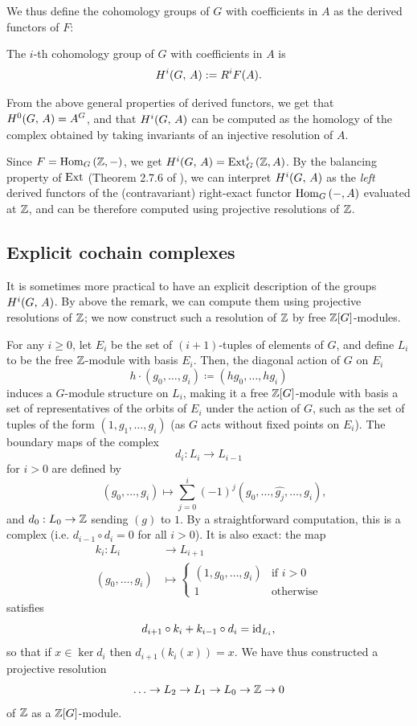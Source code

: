 \documentclass[a4paper, oneside]{memoir}
\begin{document}
We thus define the cohomology groups of $G$ with coefficients in $A$ as the derived functors of $F$:

\begin{definition}
    The $i$-th cohomology group of $G$ with coefficients in $A$ is
    \[
        H^{i}( G, \, A ):=R^iF(A).
    \]
\end{definition}
From the above general properties of derived functors, we get that $H^{0}( G, \, A )=A^G$, and that $H^{i}( G, \, A )$ can be computed as the homology of the complex obtained by taking invariants of an injective resolution of $A$.

\begin{remark}
    Since $F=\operatorname{Hom}_G{(\mathbb{Z},-)}$, we get $H^{i}( G, \, A )=\operatorname{Ext}^i_G{(\mathbb{Z},A)}$. By the balancing property of $\operatorname{Ext}$ (Theorem 2.7.6 of \cite{Weibel}), we can interpret $H^{i}( G, \, A )$ as the \textit{left} derived functors of the (contravariant) right-exact functor $\operatorname{Hom}_G{(-,A)}$ evaluated at $\mathbb{Z}$, and can be therefore computed using projective resolutions of $\mathbb{Z}$.
\end{remark}

\subsection{Explicit cochain complexes}

It is sometimes more practical to have an explicit description of the groups $H^{i}( G, \, A )$. By above the remark, we can compute them using projective resolutions of $\mathbb{Z}$; we now construct such a resolution of $\mathbb{Z}$ by free $\mathbb{Z}[G]$-modules.

For any $i\geq 0$, let $E_i$ be the set of $(i+1)$-tuples of elements of $G$, and define $L_i$ to be the free $\mathbb{Z}$-module with basis $E_i$. Then, the diagonal action of $G$ on $E_i$
\[
    h\cdot (g_0,\dots , g_i) \coloneqq (h g_0 ,\dots , h g_{i} )
\]
induces a $G$-module structure on $L_i$, making it a free $\mathbb{Z}[G]$-module with basis a set of representatives of the orbits of $E_i$ under the action of $G$, such as the set of tuples of the form $(1,g_1,\dots , g_i)$ (as $G$ acts without fixed points on $E_i$). The boundary maps of the complex
\[
    d_i: L_i \to L_{i-1}
\]
for $i>0$ are defined by
\[
    \quad (g_0,\dots , g_i) \mapsto \sum_{j=0}^{i} (-1)^j (g_0,\dots , \hat{g_j},\dots , g_i),
\]
and $d_0:L_0\to\mathbb{Z}$ sending $(g)$ to $1$. By a straightforward computation, this is a complex (i.e. $d_{i-1}\circ d_i=0$ for all $i>0$). It is also exact: the map
\begin{align*}
    k_i: L_i          & \to L_{i+1} \\
    (g_0,\dots , g_i) & \mapsto
    \begin{cases}
        (1,g_0,\dots , g_i) & \text{if } i>0   \\
        1                   & \text{otherwise}
    \end{cases}
\end{align*}
satisfies
\[
    d_{i+1}\circ k_i + k_{i-1}\circ d_i = \operatorname{id}_{L_i},
\]
so that if $x\in\ker{d_i}$ then $d_{i+1}(k_i(x))=x$.
We have thus constructed a projective resolution
\[
    \ldots\to L_2\to L_1\to L_0\to\mathbb{Z}\to 0
\]
of $\mathbb{Z}$ as a $\mathbb{Z}[G]$-module.
\end{document}
